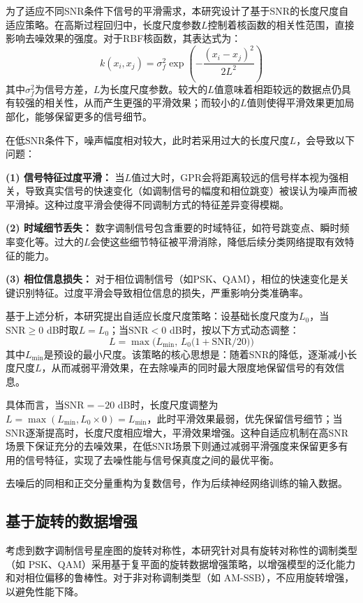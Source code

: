 \documentclass[conference]{IEEEtran}
\begin{document}
为了适应不同SNR条件下信号的平滑需求，本研究设计了基于SNR的长度尺度自适应策略。在高斯过程回归中，长度尺度参数$L$控制着核函数的相关性范围，直接影响去噪效果的强度。对于RBF核函数，其表达式为：
\begin{equation}
k(x_i, x_j) = \sigma_f^2 \exp\left(-\frac{(x_i - x_j)^2}{2L^2}\right)
\end{equation}
其中$\sigma_f^2$为信号方差，$L$为长度尺度参数。较大的$L$值意味着相距较远的数据点仍具有较强的相关性，从而产生更强的平滑效果；而较小的$L$值则使得平滑效果更加局部化，能够保留更多的信号细节。

在低SNR条件下，噪声幅度相对较大，此时若采用过大的长度尺度$L$，会导致以下问题：

\textbf{(1) 信号特征过度平滑：} 当$L$值过大时，GPR会将距离较远的信号样本视为强相关，导致真实信号的快速变化（如调制信号的幅度和相位跳变）被误认为噪声而被平滑掉。这种过度平滑会使得不同调制方式的特征差异变得模糊。

\textbf{(2) 时域细节丢失：} 数字调制信号包含重要的时域特征，如符号跳变点、瞬时频率变化等。过大的$L$会使这些细节特征被平滑消除，降低后续分类网络提取有效特征的能力。

\textbf{(3) 相位信息损失：} 对于相位调制信号（如PSK、QAM），相位的快速变化是关键识别特征。过度平滑会导致相位信息的损失，严重影响分类准确率。

基于上述分析，本研究提出自适应长度尺度策略：设基础长度尺度为$L_0$，当$\mathrm{SNR}\ge0$ dB时取$L=L_0$；当$\mathrm{SNR}<0$ dB时，按以下方式动态调整：
\begin{equation}
L = \max\bigl(L_{\min},\,L_0\bigl(1+\mathrm{SNR}/20\bigr)\bigr)
\end{equation}
其中$L_{\min}$是预设的最小尺度。该策略的核心思想是：随着SNR的降低，逐渐减小长度尺度$L$，从而减弱平滑效果，在去除噪声的同时最大限度地保留信号的有效信息。

具体而言，当$\mathrm{SNR}=-20$ dB时，长度尺度调整为$L=\max(L_{\min}, L_0 \times 0)=L_{\min}$，此时平滑效果最弱，优先保留信号细节；当SNR逐渐提高时，长度尺度相应增大，平滑效果增强。这种自适应机制在高SNR场景下保证充分的去噪效果，在低SNR场景下则通过减弱平滑强度来保留更多有用的信号特征，实现了去噪性能与信号保真度之间的最优平衡。

去噪后的同相和正交分量重构为复数信号，作为后续神经网络训练的输入数据。

\subsection{基于旋转的数据增强}
考虑到数字调制信号星座图的旋转对称性，本研究针对具有旋转对称性的调制类型（如 PSK、QAM）采用基于复平面的旋转数据增强策略，以增强模型的泛化能力和对相位偏移的鲁棒性。对于非对称调制类型（如 AM-SSB），不应用旋转增强，以避免性能下降。
\end{document}
